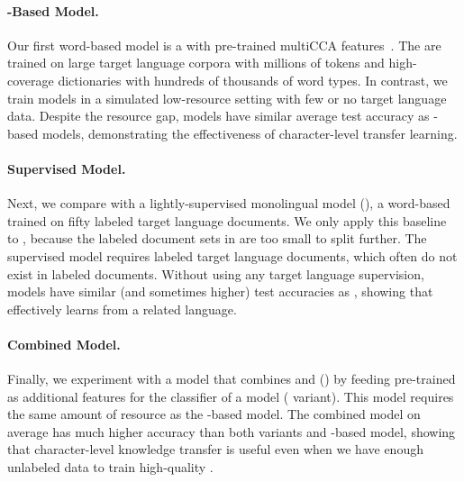 \paragraph{-Based Model.}
Our first word-based model is a  with pre-trained multiCCA 
features~\citep{ammar-16}.
The  are trained on large target language corpora with millions of
tokens and high-coverage dictionaries with hundreds of thousands of word types.
In contrast, we train \name{} models in a simulated low-resource setting with
few or no target language data.
Despite the resource gap, \name{} models have similar average test accuracy as
-based models, demonstrating the effectiveness of character-level
transfer learning.

\paragraph{Supervised Model.}
Next, we compare \name{} with a lightly-supervised monolingual model
(\textbf{}), a word-based  trained on fifty labeled target
language documents.
We only apply this baseline to , because the labeled document sets in
 are too small to split further.
The supervised model requires labeled target language documents, which often
do not exist in labeled documents.
Without using any target language supervision, \name{} models have similar
(and sometimes higher) test accuracies as , showing that \name{}
effectively learns from a related language.

\paragraph{Combined Model.}
Finally, we experiment with a model that combines \name{} and
 (\textbf{}) by feeding pre-trained  as
additional features for the classifier of a \name{} model (
variant).
This model requires the same amount of resource as the -based model.
The combined model on average has much higher accuracy than
both  variants and -based model, showing that
character-level knowledge transfer is useful even when we have enough
unlabeled data to train high-quality .

